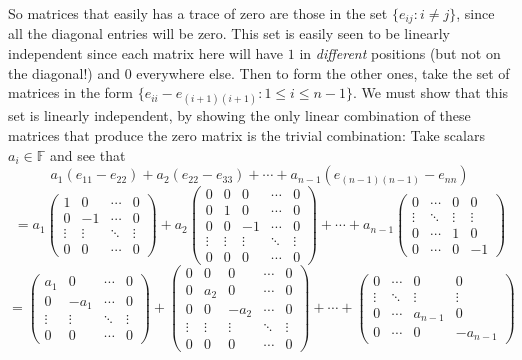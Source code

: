 \documentclass[11pt]{article}
\newcommand{\br}[1]{\left(#1\right)}
\newcommand{\cbr}[1]{\{#1\}}
\begin{document}
So matrices that easily has a trace of zero are those in the set $\cbr{e_{ij} : i\neq j}$, since all the diagonal entries will be zero. This set is easily seen to be linearly independent since each matrix here will have $1$ in \textit{different} positions (but not on the diagonal!) and $0$ everywhere else. Then to form the other ones, take the set of matrices in the form $\cbr{e_{ii} - e_{(i+1)(i+1)} : 1 \leq i \leq n-1}$. We must show that this set is linearly independent, by showing the only linear combination of these matrices that produce the zero matrix is the trivial combination: Take scalars $a_i \in \mathbb{F}$ and see that $$a_1\br{e_{11} - e_{22}} + a_2\br{e_{22} - e_{33}} + \cdots + a_{n-1}\br{e_{(n-1)(n-1)} - e_{nn}}$$
$$= a_1\begin{pmatrix}
    1 & 0 & \cdots & 0 \\
    0 & -1 & \cdots & 0 \\
    \vdots & \vdots & \ddots & \vdots \\
    0 & 0 & \cdots & 0 
\end{pmatrix} + a_2\begin{pmatrix}
    0 & 0 & 0 & \cdots & 0 \\
    0 & 1 & 0 & \cdots & 0 \\
    0 & 0 & -1 & \cdots & 0 \\
    \vdots & \vdots & \vdots & \ddots & \vdots \\
    0 & 0 & 0 & \cdots & 0 
\end{pmatrix} + \cdots + a_{n-1}\begin{pmatrix}
    0 & \cdots & 0 & 0 \\
    \vdots & \ddots & \vdots & \vdots \\
    0 & \cdots & 1 & 0 \\
    0 & \cdots & 0 & -1 
\end{pmatrix}$$
$$ = \begin{pmatrix}
    a_1 & 0 & \cdots & 0 \\
    0 & -a_1 & \cdots & 0 \\
    \vdots & \vdots & \ddots & \vdots \\
    0 & 0 & \cdots & 0 
\end{pmatrix} + \begin{pmatrix}
    0 & 0 & 0 & \cdots & 0 \\
    0 & a_2 & 0 & \cdots & 0 \\
    0 & 0 & -a_2 & \cdots & 0 \\
    \vdots & \vdots & \vdots & \ddots & \vdots \\
    0 & 0 & 0 & \cdots & 0 
\end{pmatrix} + \cdots + \begin{pmatrix}
    0 & \cdots & 0 & 0 \\
    \vdots & \ddots & \vdots & \vdots \\
    0 & \cdots & a_{n-1} & 0 \\
    0 & \cdots & 0 & -a_{n-1} 
\end{pmatrix}$$
\end{document}
